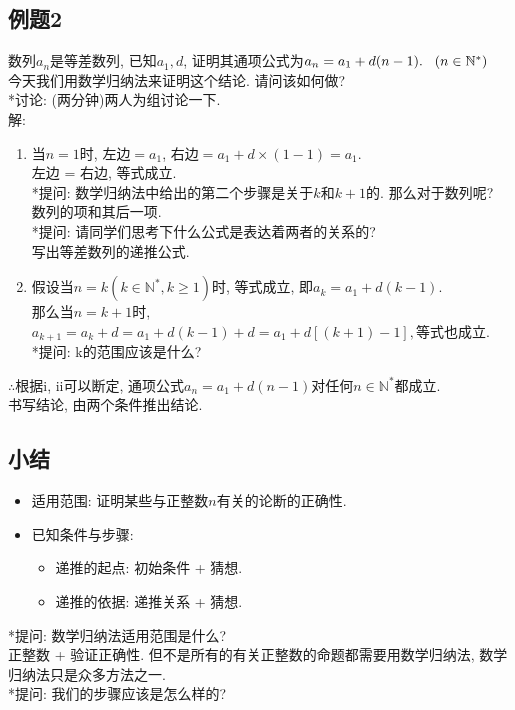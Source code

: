 \documentclass{article}
\begin{document}
\begin{CJK}{UTF8}{gkai}
\subsection{例题2}
数列${a_n}$是等差数列, 已知$a_1, d$, 证明其通项公式为$a_n = a_1 + d(n-1).\hspace{3mm}(n \in \mathbb{N}^*)$ \\
今天我们用数学归纳法来证明这个结论. 请问该如何做? \\
*讨论: (两分钟)两人为组讨论一下.\\
解: \\
\begin{enumerate}[i]
\item 当$n = 1$时, 左边$= a_1$, 右边$= a_1 + d \times (1-1) = a_1$.\\左边 = 右边, 等式成立.\\
*提问: 数学归纳法中给出的第二个步骤是关于$k$和$k + 1$的. 那么对于数列呢?\\
数列的项和其后一项.\\
*提问: 请同学们思考下什么公式是表达着两者的关系的?  \\
写出等差数列的递推公式.\\

\item 假设当$n = k (k \in \mathbb{N}^*, k \ge 1)$时, 等式成立, 即$a_k = a_1 + d(k-1).$\\那么当$n = k + 1$时, $a_{k+1} = a_k + d = a_1 + d(k-1) + d = a_1 +d[(k + 1) - 1], $等式也成立.\\
*提问: k的范围应该是什么?\\
\end{enumerate}
$\therefore$根据i, ii可以断定, 通项公式$a_n = a_1 + d(n-1)$对任何$n \in \mathbb{N}^*$都成立.\\
书写结论, 由两个条件推出结论.\\

\subsection{小结}
\begin{itemize}
\item 适用范围: 证明某些与正整数$n$有关的论断的正确性.
\item 已知条件与步骤:
\begin{itemize}
\item 递推的起点: 初始条件 + 猜想.
\item 递推的依据: 递推关系 + 猜想.
\end{itemize}
\end{itemize}
*提问: 数学归纳法适用范围是什么?\\
正整数 + 验证正确性. 但不是所有的有关正整数的命题都需要用数学归纳法, 数学归纳法只是众多方法之一.\\
*提问: 我们的步骤应该是怎么样的?\\


\end{CJK}
\end{document}
